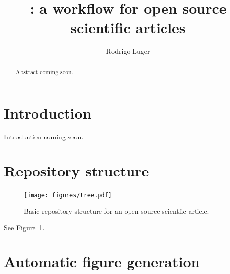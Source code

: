 \documentclass[twocolumn]{aastex631}
\begin{document}
\title{\showyourwork: a workflow for open source scientific articles}

\author[0000-0002-0296-3826]{Rodrigo Luger}

\begin{abstract}
    Abstract coming soon.
\end{abstract}

\section{Introduction}

Introduction coming soon.

\section{Repository structure}

\begin{figure}[ht!]
    \begin{centering}
        \texttt{[image: figures/tree.pdf]}
        \caption{
            Basic repository structure for an open source scientfic article.
        }
        \label{fig:tree}
    \end{centering}
\end{figure}

See Figure~\ref{fig:tree}.

\section{Automatic figure generation}
\end{document}
